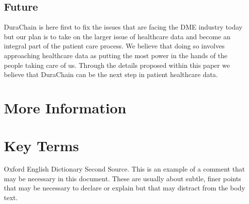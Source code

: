 \documentclass[letterpaper]{article}
\begin{document}
\subsection{Future}
DuraChain is here first to fix the issues that are facing the DME industry today but our plan is to take on the larger issue of healthcare data and become an integral part of the patient care process. We believe that doing so involves approaching healthcare data as putting the most power in the hands of the people taking care of us. Through the details proposed within this paper we believe that DuraChain can be the next step in patient healthcare data.
%
\begin{acknowledgments}
%
\end{acknowledgments}


\appendix*
\section{More Information}
%
\appendix*
\section{Key Terms}
%
\begin{thebibliography}{99}
%
 Oxford English Dictionary
%
 Second Source.
%
 This is an example of a comment that may be necessary in this
document. These are usually about subtle, finer points
that may be necessary to declare or explain but that may distract from
the body text.
%
\end{thebibliography}
\end{document}
